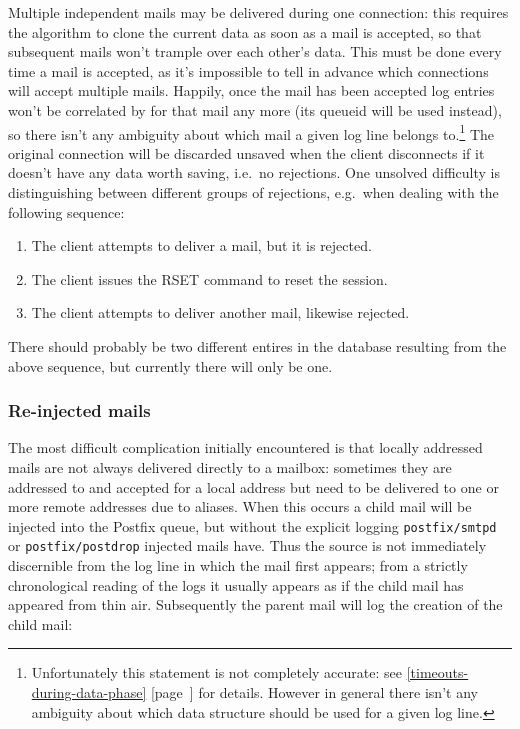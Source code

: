 \documentclass[a4paper,12pt,draft]{article}
\newcommand{\refwithpage}[1]{%
    \empty{}\ref{#1} [page~\pageref{#1}]%
}
\newcommand{\sectionref}[1]{%
    \textsection{}\refwithpage{#1}%
}
\newcommand{\daemon}[1]{%
    \texttt{postfix/#1}%
}
\begin{document}
\label{connection reuse}

Multiple independent mails may be delivered during one connection: this
requires the algorithm to clone the current data as soon as a mail is
accepted, so that subsequent mails won't trample over each other's data.
This must be done every time a mail is accepted, as it's impossible to tell
in advance which connections will accept multiple mails.  Happily, once the
mail has been accepted log entries won't be correlated by \pid{} for that
mail any more (its queueid will be used instead), so there isn't any
ambiguity about which mail a given log line belongs
to.\footnote{Unfortunately this statement is not completely accurate: see
\sectionref{timeouts-during-data-phase} for details.  However in general
there isn't any ambiguity about which data structure should be used for a
given log line.}  The original connection will be discarded unsaved when
the client disconnects if it doesn't have any data worth saving, i.e.\ no
rejections.  One unsolved difficulty is distinguishing between different
groups of rejections, e.g.\ when dealing with the following sequence:

\begin{enumerate}

    \item The client attempts to deliver a mail, but it is rejected.

    \item The client issues the RSET command to reset the session.

    \item The client attempts to deliver another mail, likewise rejected.

\end{enumerate}

There should probably be two different entires in the database resulting
from the above sequence, but currently there will only be one.



\subsubsection{Re-injected mails}

The most difficult complication initially encountered is that locally
addressed mails are not always delivered directly to a mailbox: sometimes
they are addressed to and accepted for a local address but need to be
delivered to one or more remote addresses due to aliases.  When this occurs
a child mail will be injected into the Postfix queue, but without the
explicit logging \daemon{smtpd} or \daemon{postdrop} injected mails have.
Thus the source is not immediately discernible from the log line in which
the mail first appears; from a strictly chronological reading of the logs
it usually appears as if the child mail has appeared from thin air.
Subsequently the parent mail will log the creation of the child mail:
\end{document}

